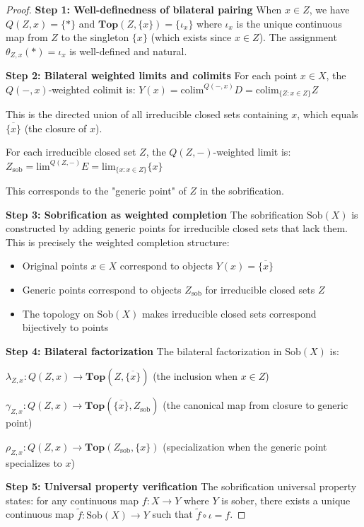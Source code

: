 \documentclass[11pt]{article}
\theoremstyle{plain}
\theoremstyle{definition}
\theoremstyle{remark}
\newcommand{\colim}{\mathrm{colim}}
\renewcommand{\lim}{\mathrm{lim}}
\begin{document}
\begin{proof}
\textbf{Step 1: Well-definedness of bilateral pairing}
When $x \in Z$, we have $Q(Z, x) = \{*\}$ and $\mathbf{Top}(Z, \{x\}) = \{\iota_x\}$ where $\iota_x$ is the unique continuous map from $Z$ to the singleton $\{x\}$ (which exists since $x \in Z$). The assignment $\theta_{Z,x}(*) = \iota_x$ is well-defined and natural.

\textbf{Step 2: Bilateral weighted limits and colimits}
For each point $x \in X$, the $Q(-, x)$-weighted colimit is:
$Y(x) = \colim^{Q(-, x)} D = \colim_{\{Z : x \in Z\}} Z$

This is the directed union of all irreducible closed sets containing $x$, which equals $\overline{\{x\}}$ (the closure of $x$).

For each irreducible closed set $Z$, the $Q(Z, -)$-weighted limit is:
$Z_{\text{sob}} = \lim^{Q(Z, -)} E = \lim_{\{x : x \in Z\}} \{x\}$

This corresponds to the "generic point" of $Z$ in the sobrification.

\textbf{Step 3: Sobrification as weighted completion}
The sobrification $\text{Sob}(X)$ is constructed by adding generic points for irreducible closed sets that lack them. This is precisely the weighted completion structure:

\begin{itemize}
\item Original points $x \in X$ correspond to objects $Y(x) = \overline{\{x\}}$
\item Generic points correspond to objects $Z_{\text{sob}}$ for irreducible closed sets $Z$
\item The topology on $\text{Sob}(X)$ makes irreducible closed sets correspond bijectively to points
\end{itemize}

\textbf{Step 4: Bilateral factorization}
The bilateral factorization in $\text{Sob}(X)$ is:

$\lambda_{Z,x} : Q(Z, x) \to \mathbf{Top}(Z, \overline{\{x\}})$ (the inclusion when $x \in Z$)

$\gamma_{Z,x} : Q(Z, x) \to \mathbf{Top}(\overline{\{x\}}, Z_{\text{sob}})$ (the canonical map from closure to generic point)

$\rho_{Z,x} : Q(Z, x) \to \mathbf{Top}(Z_{\text{sob}}, \{x\})$ (specialization when the generic point specializes to $x$)

\textbf{Step 5: Universal property verification}
The sobrification universal property states: for any continuous map $f : X \to Y$ where $Y$ is sober, there exists a unique continuous map $\tilde{f} : \text{Sob}(X) \to Y$ such that $\tilde{f} \circ \iota = f$.


\end{proof}
\end{document}
